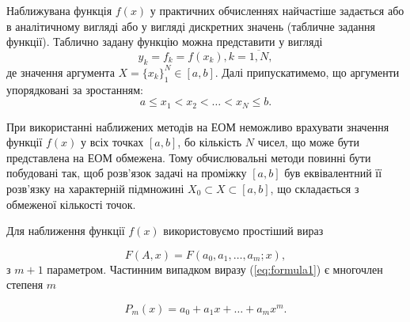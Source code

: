 \documentclass[ukrainian,14pt]{extarticle}
\begin{document}
%

Наближувана функція $f(x)$ у практичних обчисленнях найчастіше задається або в аналітичному вигляді або у вигляді дискретних значень (табличне задання функції). Таблично задану функцію можна представити у вигляді
$$y_k = f_k = f(x_k), k =\overline{1,N},$$
де значення аргумента $X=\{x_k\}_1^N \in [a, b]$. Далі припускатимемо, що аргументи упорядковані за зростанням:
$$a \leq x_1 < x_2 < \ldots < x_N \leq b.$$



При використанні наближених методів на ЕОМ неможливо врахувати значення функції $f(x)$ у всіх точках $[a,b]$, бо кількість $N$ 
чисел, що може бути представлена на ЕОМ обмежена. Тому обчислювальні методи повинні бути побудовані так, щоб розв'язок
задачі на проміжку $[a,b]$ був еквівалентний її розв'язку на характерній підмножині $X_0 \subset X \subset [a,b]$, що складається з обмеженої кількості точок.

Для наближення функції $f(x)$ використовуємо простіший вираз

\begin{equation}\label{eq:formula1}
F(A,x) = F(a_0, a_1,\ldots, a_m; x),
\end{equation}з $m+1$ параметром. Частинним випадком виразу (\ref{eq:formula1}) є многочлен степеня $m$

\begin{equation}\label{eq:formula2}
P_m(x) = a_0 + a_1x + \ldots + a_mx^m.
\end{equation}
\end{document}
